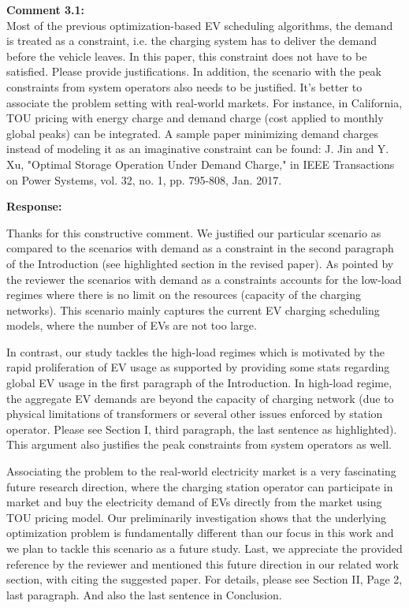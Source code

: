 \documentclass[11pt]{article}
\begin{document}
\vspace{5mm}
{
{\color{blue}\noindent\textbf{Comment 3.1:}\\
Most of the previous optimization-based EV scheduling algorithms, the demand is treated as a constraint, i.e. the charging system has to deliver the demand before the vehicle leaves. In this paper, this constraint does not have to be satisfied. Please provide justifications. In addition, the scenario with the peak constraints from system operators also needs to be justified. It's better to associate the problem setting with real-world markets. For instance, in California, TOU pricing with energy charge and demand charge (cost applied to monthly global peaks) can be integrated. A sample paper minimizing demand charges instead of modeling it as an imaginative constraint can be found:
J. Jin and Y. Xu, "Optimal Storage Operation Under Demand Charge," in IEEE Transactions on Power Systems, vol. 32, no. 1, pp. 795-808, Jan. 2017.
}}

\vspace{5mm}
\noindent\textbf{Response:}

Thanks for this constructive comment. We justified our particular scenario as compared to the scenarios with demand as a constraint in the second paragraph of the Introduction (see highlighted section in the revised paper). As pointed by the reviewer the scenarios with demand as a constraints accounts for the low-load regimes where there is no limit on the resources (capacity of the charging networks). This scenario mainly captures the current EV charging scheduling models, where the number of EVs are not too large. 

In contrast, our study tackles the high-load regimes which is motivated by the rapid proliferation of EV usage as supported by providing some stats regarding global EV usage in the first paragraph of the Introduction. In high-load regime, the aggregate EV demands are beyond the capacity of charging network (due to physical limitations of transformers or several other issues enforced by station operator. Please see Section I, third paragraph, the last sentence as highlighted). This argument also justifies the peak constraints from system operators as well. 

Associating the problem to the real-world electricity market is a very fascinating future research direction, where the charging station operator can participate in market and buy the electricity demand of EVs directly from the market using TOU pricing model. Our preliminarily investigation shows that the underlying optimization problem is fundamentally different than our focus in this work and we plan to tackle this scenario as a future study. Last, we appreciate the provided reference by the reviewer and mentioned this future direction in our related work section, with citing the suggested paper. For details, please see Section II, Page 2, last paragraph.   And also the last sentence in Conclusion. 
\end{document}
